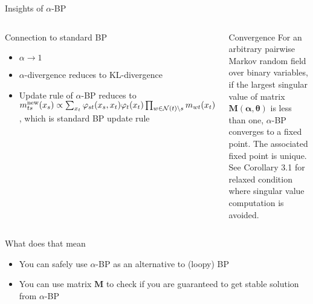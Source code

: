 \begin{frame}{Insights of $\alpha$-BP}
  \begin{columns}
    \begin{block}{\small Connection to standard BP}
      \begin{itemize}[label=$\bullet$]
      \item $\alpha \rightarrow 1$ 
      \item $\alpha$-divergence reduces to KL-divergence
      \item Update rule of $\alpha$-BP reduces to ${m}^{\text{new}}_{ts}(x_s) \propto \sum_{x_t} \varphi_{st}(x_s, x_t) {\varphi}_t(x_t) \prod_{w\in \mathcal{N}(t)\backslash s}m_{wt}(x_t)$, which is standard BP update rule
        
      \end{itemize}
    \end{block}
    \begin{block}{\small Convergence}
      For an arbitrary pairwise Markov random field over binary variables,
      if the largest singular value of matrix $\bm{M}(\bm{\alpha}, \bm{\theta})$ is less than one,
      $\alpha$-BP converges to a fixed point. The associated fixed point is unique.
      \vfill
      {\tiny See Corollary 3.1 for relaxed condition where singular value computation is avoided.}
    \end{block}
  \end{columns}
  \vskip 0.5cm
  \begin{block}{\small What does that mean}
    \begin{itemize}[label=$\bullet$]
    \item You can safely use $\alpha$-BP as an alternative to (loopy) BP
    \item You can use matrix $\bm{M}$ to check if you are guaranteed to get stable solution from $\alpha$-BP
    \end{itemize}
  \end{block}
  \let\thefootnote\relax{}
\end{frame}

